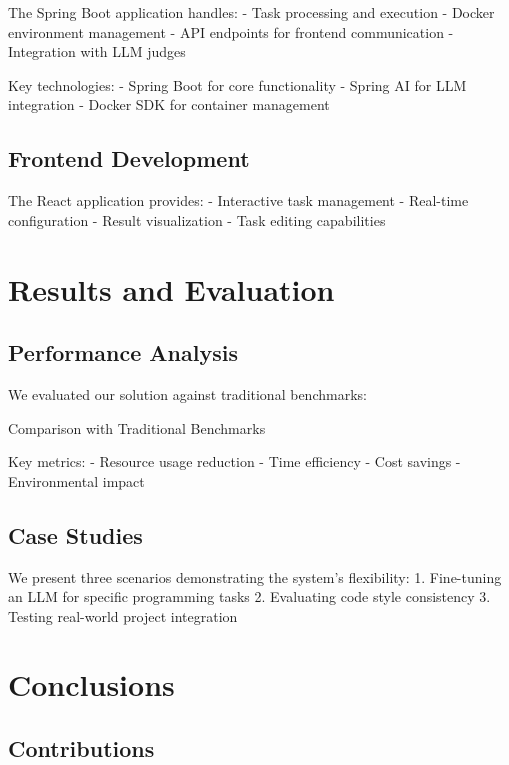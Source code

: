 The Spring Boot application handles:
- Task processing and execution
- Docker environment management
- API endpoints for frontend communication
- Integration with LLM judges

Key technologies:
- Spring Boot for core functionality
- Spring AI for LLM integration
- Docker SDK for container management

\section{Frontend Development}

The React application provides:
- Interactive task management
- Real-time configuration
- Result visualization
- Task editing capabilities

\chapter{Results and Evaluation}

\section{Performance Analysis}

We evaluated our solution against traditional benchmarks:

\begin{table}[h]
    \centering
    \caption{Comparison with Traditional Benchmarks}
    \label{tab:comparison}
\end{table}

Key metrics:
- Resource usage reduction
- Time efficiency
- Cost savings
- Environmental impact

\section{Case Studies}

We present three scenarios demonstrating the system's flexibility:
1. Fine-tuning an LLM for specific programming tasks
2. Evaluating code style consistency
3. Testing real-world project integration

\chapter{Conclusions}

\section{Contributions}

